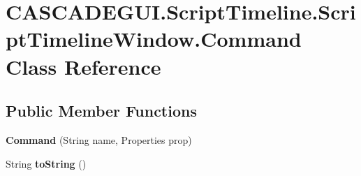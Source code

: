 \hypertarget{classCASCADEGUI_1_1ScriptTimeline_1_1ScriptTimelineWindow_1_1Command}{\section{C\-A\-S\-C\-A\-D\-E\-G\-U\-I.\-Script\-Timeline.\-Script\-Timeline\-Window.\-Command Class Reference}
\label{classCASCADEGUI_1_1ScriptTimeline_1_1ScriptTimelineWindow_1_1Command}
}
\subsection*{Public Member Functions}
\begin{DoxyCompactItemize}
\item 
\hypertarget{classCASCADEGUI_1_1ScriptTimeline_1_1ScriptTimelineWindow_1_1Command_a7f98b12562cf7ee1f2cccb78ea7a7a4f}{{\bfseries Command} (String name, Properties prop)}\label{classCASCADEGUI_1_1ScriptTimeline_1_1ScriptTimelineWindow_1_1Command_a7f98b12562cf7ee1f2cccb78ea7a7a4f}

\item 
\hypertarget{classCASCADEGUI_1_1ScriptTimeline_1_1ScriptTimelineWindow_1_1Command_a88b98968e45ef45d8bed29d358552353}{String {\bfseries to\-String} ()}\label{classCASCADEGUI_1_1ScriptTimeline_1_1ScriptTimelineWindow_1_1Command_a88b98968e45ef45d8bed29d358552353}

\end{DoxyCompactItemize}
